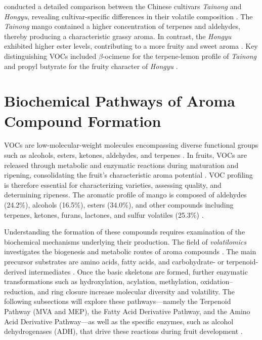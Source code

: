\vspace{1em}
\textcite{A15_Xie2023} conducted a detailed comparison between the Chinese cultivars \textit{Tainong} and \textit{Hongyu}, revealing cultivar-specific differences in their volatile composition \cite*{A15_Xie2023}. The \textit{Tainong} mango contained a higher concentration of terpenes and aldehydes, thereby producing a characteristic grassy aroma.  In contrast, the \textit{Hongyu} exhibited higher ester levels, contributing to a more fruity and sweet aroma \cite*{A15_Xie2023}. Key distinguishing VOCs included $\beta$-ocimene for the terpene-lemon profile of \textit{Tainong} and propyl butyrate for the fruity character of \textit{Hongyu} \cite*{A15_Xie2023}.



\section{Biochemical Pathways of Aroma Compound Formation}
VOCs are low-molecular-weight molecules encompassing diverse functional groups such as alcohols, esters, ketones, aldehydes, and terpenes \cite*{A01_Aguirre-Lopez_2023, B01_TerpenesTerpenoids_2018}. In fruits, VOCs are released through metabolic and enzymatic reactions during maturation and ripening, consolidating the fruit’s characteristic aroma potential \cite*{A01_Aguirre-Lopez_2023}. VOC profiling is therefore essential for characterizing varieties, assessing quality, and determining ripeness. The aromatic profile of mango is composed of aldehydes (24.2\%), alcohols (16.5\%), esters (34.0\%), and other compounds including terpenes, ketones, furans, lactones, and sulfur volatiles (25.3\%) \cite*{A01_Aguirre-Lopez_2023}.

\vspace{1em}
Understanding the formation of these compounds requires examination of the biochemical mechanisms underlying their production. The field of \textit{volatilomics} investigates the biogenesis and metabolic routes of aroma compounds \cite*{A01_Aguirre-Lopez_2023}. The main precursor substrates are amino acids, fatty acids, and carbohydrate- or terpenoid-derived intermediates \cite*{A13_ElHadi2013}. Once the basic skeletons are formed, further enzymatic transformations such as hydroxylation, acylation, methylation, oxidation–reduction, and ring closure increase molecular diversity and volatility. The following subsections will explore these pathways—namely the Terpenoid Pathway (MVA and MEP), the Fatty Acid Derivative Pathway, and the Amino Acid Derivative Pathway—as well as the specific enzymes, such as alcohol dehydrogenases (ADH), that drive these reactions during fruit development \cite*{A10_Singh2010}.

